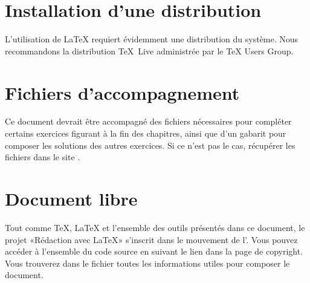 \section*{Installation d'une distribution}

L'utilisation de {\LaTeX} requiert évidemment une distribution du
système. Nous recommandons la distribution {\TeX}~Live administrée par
le {\TeX} Users Group.


\section*{Fichiers d'accompagnement}

Ce document devrait être accompagné des fichiers nécessaires pour
compléter certains exercices figurant à la fin des chapitres, ainsi
que d'un gabarit  pour composer les
solutions des autres exercices. Si ce n'est pas le cas, récupérer les
fichiers dans le site .

\section*{Document libre}

Tout comme {\TeX}, {\LaTeX} et l'ensemble des outils présentés dans ce
document, le projet «Rédaction avec {\LaTeX}» s'inscrit dans le
mouvement de
l'. Vous pouvez accéder à l'ensemble du code source en suivant
le lien dans la page de copyright. Vous trouverez dans le fichier
 toutes les informations utiles pour composer le
document.

